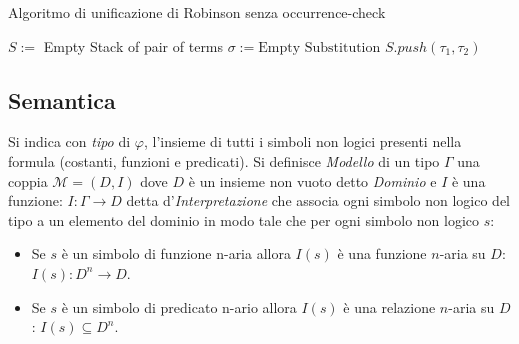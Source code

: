 \documentclass[./main.tex]{subfiles}
\begin{document}
\begin{algorithm}[H]
  \caption{Algoritmo di unificazione di Robinson senza occurrence-check}


  $S :=$ Empty Stack of pair of terms\;
  $\sigma := \text{Empty Substitution}$\;
  \BlankLine
  $S.push(\tau_1, \tau_2)$\;

  \Return{$\sigma$}\;
\end{algorithm}



\subsection{Semantica} \label{sec:semantica_fof}
Si indica con \textit{tipo} di $\varphi$, l'insieme di tutti i simboli non logici presenti nella formula (costanti, funzioni e predicati).
Si definisce \textit{Modello} di un tipo $\Gamma$ una coppia $\mathcal{M} = (D, I)$ dove $D$ è un insieme non vuoto detto \textit{Dominio} e $I$ è una funzione: 
$I: \Gamma \rightarrow D$ detta d'\textit{Interpretazione} che associa ogni simbolo non logico del tipo a un elemento del dominio in modo tale che per ogni simbolo non logico $s$:

\begin{itemize}
  \item Se $s$ è un simbolo di funzione n-aria allora $I(s)$ è una funzione $n$-aria su $D$: $I(s): D^n \rightarrow D$.
  \item Se $s$ è un simbolo di predicato n-ario allora $I(s)$ è una relazione $n$-aria su $D$: $I(s) \subseteq D^n$.
\end{itemize}
\end{document}
